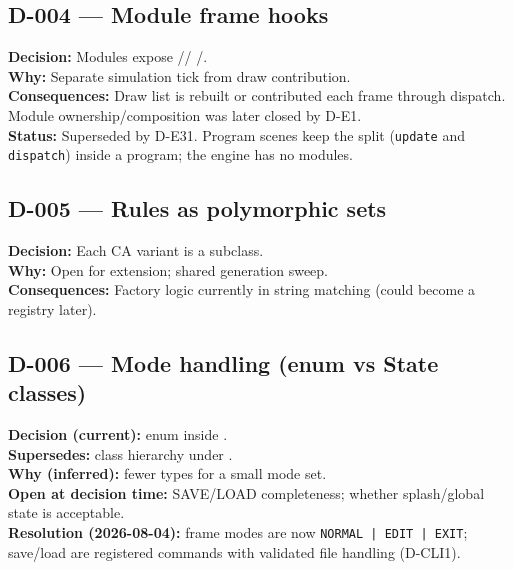 \subsection*{D-004 --- Module frame hooks}
\begin{decisionbox}[title={D-004 \quad inferred from IModule}]
\textbf{Decision:} Modules expose //
/.\\
\textbf{Why:} Separate simulation tick from draw contribution.\\
\textbf{Consequences:} Draw list is rebuilt or contributed each frame through
dispatch. Module ownership/composition was later closed by D-E1.\\
\textbf{Status:} Superseded by D-E31. Program scenes keep the split
(\texttt{update} and \texttt{dispatch}) inside a program; the engine has no
modules.
\end{decisionbox}

\subsection*{D-005 --- Rules as polymorphic sets}
\begin{decisionbox}[title={D-005 \quad inferred}]
\textbf{Decision:} Each CA variant is a  subclass.\\
\textbf{Why:} Open for extension; shared generation sweep.\\
\textbf{Consequences:} Factory logic currently in 
string matching (could become a registry later).
\end{decisionbox}

\subsection*{D-006 --- Mode handling (enum vs State classes)}
\begin{decisionbox}[title={D-006 \quad current code; author may supersede}]
\textbf{Decision (current):}  enum inside
.\\
\textbf{Supersedes:} class hierarchy under .\\
\textbf{Why (inferred):} fewer types for a small mode set.\\
\textbf{Open at decision time:} SAVE/LOAD completeness; whether splash/global
state is acceptable.\\
\textbf{Resolution (2026-08-04):} frame modes are now
\texttt{NORMAL | EDIT | EXIT}; save/load are registered commands with validated
file handling (D-CLI1).
\end{decisionbox}

